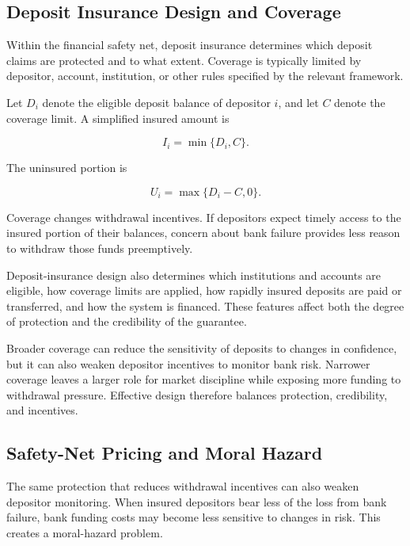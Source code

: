 \subsection{Deposit Insurance Design and Coverage}

Within the financial safety net, deposit insurance determines which deposit claims are protected and to what extent. Coverage is typically limited by depositor, account, institution, or other rules specified by the relevant framework.

Let \(D_i\) denote the eligible deposit balance of depositor \(i\), and let \(C\) denote the coverage limit. A simplified insured amount is

\begin{equation}
I_i
=
\min\{D_i,C\}.
\label{eq:ch23-deposit-insurance}
\end{equation}

The uninsured portion is

\begin{equation}
U_i
=
\max\{D_i-C,0\}.
\label{eq:ch23-uninsured-deposit}
\end{equation}

Coverage changes withdrawal incentives. If depositors expect timely access to the insured portion of their balances, concern about bank failure provides less reason to withdraw those funds preemptively.

Deposit-insurance design also determines which institutions and accounts are eligible, how coverage limits are applied, how rapidly insured deposits are paid or transferred, and how the system is financed. These features affect both the degree of protection and the credibility of the guarantee.

Broader coverage can reduce the sensitivity of deposits to changes in confidence, but it can also weaken depositor incentives to monitor bank risk. Narrower coverage leaves a larger role for market discipline while exposing more funding to withdrawal pressure. Effective design therefore balances protection, credibility, and incentives.

\subsection{Safety-Net Pricing and Moral Hazard}

The same protection that reduces withdrawal incentives can also weaken depositor monitoring. When insured depositors bear less of the loss from bank failure, bank funding costs may become less sensitive to changes in risk. This creates a moral-hazard problem.

